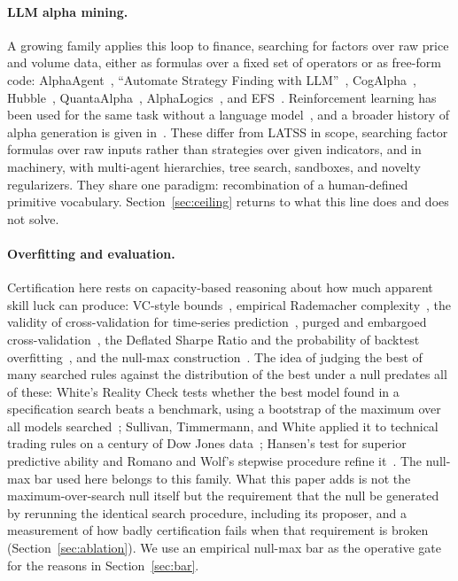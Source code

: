 \documentclass[11pt]{article}
\begin{document}
\paragraph{LLM alpha mining.} A growing family applies this loop to finance, searching for factors
over raw price and volume data, either as formulas over a fixed set of operators or as free-form code:
AlphaAgent~\cite{alphaagent}, ``Automate Strategy Finding with LLM''~\cite{automate},
CogAlpha~\cite{cogalpha}, Hubble~\cite{hubble}, QuantaAlpha~\cite{quantaalpha},
AlphaLogics~\cite{alphalogics}, and EFS~\cite{efs}. Reinforcement learning has been used for the same
task without a language model~\cite{alphagen}, and a broader history of alpha generation is given
in~\cite{evolutionalpha}. These differ from LATSS in scope, searching factor formulas over raw
inputs rather than strategies over given indicators, and in machinery, with multi-agent hierarchies,
tree search, sandboxes, and novelty regularizers. They share one paradigm: recombination of a
human-defined primitive vocabulary. Section~\ref{sec:ceiling} returns to what this line does and does
not solve.

\paragraph{Overfitting and evaluation.} Certification here rests on capacity-based reasoning about
how much apparent skill luck can produce: VC-style bounds~\cite{vapnik}, empirical Rademacher
complexity~\cite{bartlett}, the validity of cross-validation for time-series
prediction~\cite{bergmeir}, purged and embargoed cross-validation~\cite{deprado}, the Deflated Sharpe
Ratio and the probability of backtest overfitting~\cite{deflated,pbo}, and the null-max
construction~\cite{nullmax}. The idea of judging the best of many searched rules against the
distribution of the best under a null predates all of these: White's Reality Check tests whether the best
model found in a specification search beats a benchmark, using a bootstrap of the maximum over all models
searched~\cite{white2000}; Sullivan, Timmermann, and White applied it to technical trading rules on a
century of Dow Jones data~\cite{stw1999}; Hansen's test for superior predictive ability and Romano and
Wolf's stepwise procedure refine it~\cite{hansen2005,romanowolf}. The null-max bar used here belongs to
this family. What this paper adds is not the maximum-over-search null itself but the requirement that the
null be generated by rerunning the identical search procedure, including its proposer, and a measurement
of how badly certification fails when that requirement is broken (Section~\ref{sec:ablation}). We use an
empirical null-max bar as the operative gate for the reasons in Section~\ref{sec:bar}.
\end{document}

